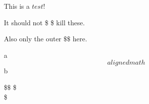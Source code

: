 This is a $test$!

It should not \$ \$ kill these.

Also only the outer $ \$\$$ here.

a$$alignedmath$$b

$$$$$$$$
\$$ \$$
\$$$ $$\$
